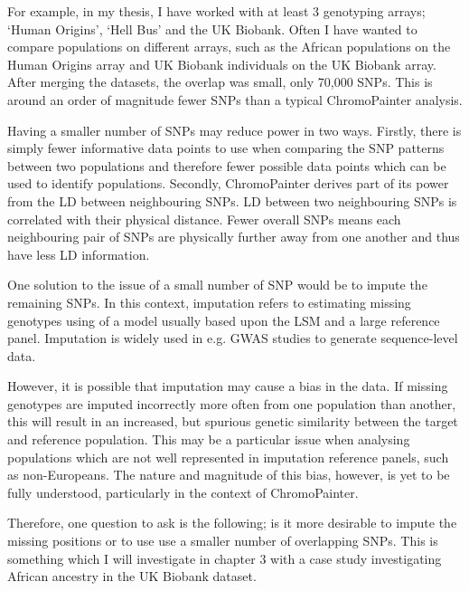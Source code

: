 For example, in my thesis, I have worked with at least 3 genotyping arrays; `Human Origins', `Hell Bus' and the UK Biobank. Often I have wanted to compare populations on different arrays, such as the African populations on the Human Origins array and UK Biobank individuals on the UK Biobank array. After merging the datasets, the overlap was small, only 70,000 SNPs. This is around an order of magnitude fewer SNPs than a typical ChromoPainter analysis. 

Having a smaller number of SNPs may reduce power in two ways. Firstly, there is simply fewer informative data points to use when comparing the SNP patterns between two populations and therefore fewer possible data points which can be used to identify populations. Secondly, ChromoPainter derives part of its power from the LD between neighbouring SNPs. LD between two neighbouring SNPs is correlated with their physical distance. Fewer overall SNPs means each neighbouring pair of SNPs are physically further away from one another and thus have less LD information. 

One solution to the issue of a small number of SNP would be to impute the remaining SNPs. In this context, imputation refers to estimating missing genotypes using of a model usually based upon the LSM and a large reference panel. Imputation is widely used in e.g. GWAS studies to generate sequence-level data.

However, it is possible that imputation may cause a bias in the data. If missing genotypes are imputed incorrectly more often from one population than another, this will result in an increased, but spurious genetic similarity between the target and reference population. This may be a particular issue when analysing populations which are not well represented in imputation reference panels, such as non-Europeans. The nature and magnitude of this bias, however, is yet to be fully understood, particularly in the context of ChromoPainter.  

Therefore, one question to ask is the following; is it more desirable to impute the missing positions or to use use a smaller number of overlapping SNPs. This is something which I will investigate in chapter 3 with a case study investigating African ancestry in the UK Biobank dataset. 
 
